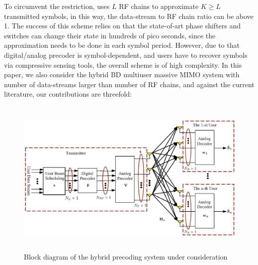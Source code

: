 \documentclass[conference]{IEEEtran}
\begin{document}
To circumvent the restriction, \cite{garcia2017mimo} uses $L$ RF chains to approximate $K\geq L$ transmitted symbols, in this way, the data-stream to RF chain ratio can be above 1. The success of this scheme relies on that the state-of-art phase shifters and switches can change their state in hundreds of pico seconds, since the approximation needs to be done in each symbol period. However, due to that digital/analog precoder is symbol-dependent, and users have to recover symbols via compressive sensing tools, the overall scheme is of high complexity. In this paper, we also consider the hybrid BD multiuser massive MIMO system with number of data-streams larger than number of RF chains, and against the current literature, our contributions are threefold:

\begin{figure}[t]
	\centering
	\begin{minipage}[t]{0.7\linewidth}
		\includegraphics[width=5.6in,height=3in]{PPTFigure/BlockDiagonal.eps}
		\caption{Block diagram of the hybrid precoding system under consideration}\label{fig:BlockDiagram}
		\parbox{6.5cm}{\small \hspace{1.5cm} }
	\end{minipage}
\end{figure}
\end{document}

